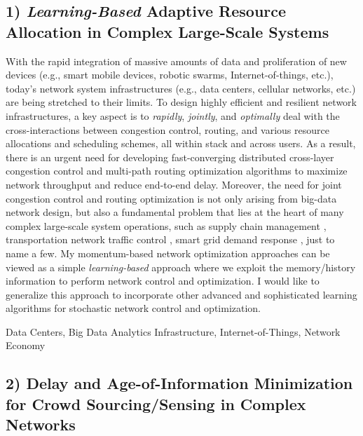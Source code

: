 \documentclass[10pt]{article}
\theoremstyle{plain} \numberwithin{equation}{section}
\theoremstyle{definition}
\begin{document}
\subsection*{1) {\em Learning-Based} Adaptive Resource Allocation in Complex Large-Scale Systems}

With the rapid integration of massive amounts of data and proliferation of new devices  (e.g., smart mobile devices, robotic swarms, Internet-of-things, etc.), today's network system infrastructures (e.g., data centers, cellular networks, etc.) are being stretched to their limits.
To design highly efficient and resilient network infrastructures, a key aspect is to {\em rapidly}, {\em jointly}, and {\em optimally} deal with the cross-interactions between congestion control, routing, and various resource allocations and scheduling schemes, all within stack and across users.
As a result, there is an urgent need for developing fast-converging distributed cross-layer congestion control and multi-path routing optimization algorithms to maximize network throughput and reduce end-to-end delay.
Moreover, the need for joint congestion control and routing optimization is not only arising from big-data network design, but also a fundamental problem that lies at the heart of many complex large-scale system operations, such as supply chain management \cite{Bertsekas0507:DP,Neely10:SupplyChain,Dai05:SupplyChain,Jiang09:SupplyChain}, transportation network traffic control \cite{Varaiya13:Transport,Le13:Transport}, smart grid demand response \cite{Huang12:DR,Neely10:DR,Neely11:DR}, just to name a few. 
My momentum-based network optimization approaches can be viewed as a simple {\em learning-based} approach where we exploit the memory/history information to perform network control and optimization.
I would like to generalize this approach to incorporate other advanced and sophisticated learning algorithms for stochastic network control and optimization.


\smallskip
{} Data Centers, Big Data Analytics Infrastructure, Internet-of-Things, Network Economy


\subsection*{2) Delay and Age-of-Information Minimization for Crowd Sourcing/Sensing in Complex Networks}
\end{document}
